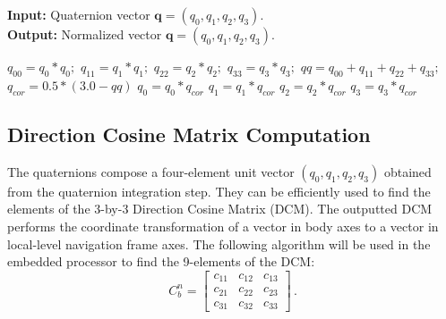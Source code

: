 \documentclass[journal]{IEEEtran}
\begin{document}
\begin{algorithm}[h]
\caption{Efficient quaternion normalization}
 \hspace*{\algorithmicindent} \textbf{Input:} Quaternion vector $\boldsymbol{q}=(q_0,q_1,q_2,q_3)$.  \\
 \hspace*{\algorithmicindent} \textbf{Output:} Normalized vector $\boldsymbol{q}=(q_0,q_1,q_2,q_3)$. 
\begin{algorithmic}[1]
\State $q_{00} = q_0 * q_0;$
\State $q_{11} = q_1 * q_1;$
\State $q_{22} = q_2 * q_2;$
\State $q_{33} = q_3 * q_3;$
\State  $qq = q_{00} + q_{11} +q_{22} + q_{33}; $ 
\State $q_{cor}=0.5*(3.0 -qq) $ %
\State ${q_0}=q_0 * q_{cor} $
\State ${q_1}=q_1 * q_{cor} $
\State ${q_2}=q_2  * q_{cor} $
\State ${q_3}=q_3  *q_{cor} $

\end{algorithmic}
\end{algorithm}



%
\subsection{Direction Cosine Matrix Computation}
The quaternions compose a four-element unit vector $(q_0, q_1, q_2, q_3)$ obtained from the quaternion integration step. They can be efficiently used to find the elements of the 3-by-3 Direction Cosine Matrix (DCM). The outputted DCM performs the coordinate transformation of a vector in body axes to a vector in local-level navigation frame axes. 
The following algorithm will be used in the embedded processor to find the 9-elements of the DCM:
\begin{equation}
    C_b^n= \begin{bmatrix}
    c_{11} & c_{12} & c_{13} \\
    c_{21} & c_{22} & c_{23} \\
    c_{31} & c_{32}& c_{33}
    \end{bmatrix}\,.
\end{equation}
\end{document}
